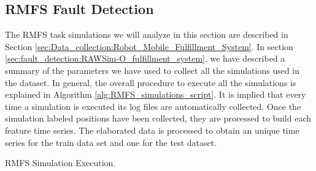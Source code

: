 \documentclass[../../Thesis.tex]{subfiles}
\begin{document}
		\subsection{RMFS Fault Detection}
			The RMFS task simulations we will analyze in this section are described in Section \ref{sec:Data_collection:Robot_Mobile_Fulfillment_System}. In section \ref{sec:fault_detection:RAWSim-O_fulfillment_system}, we have described a summary of the parameters we have used to collect all the simulations used in the dataset. In general, the overall procedure to execute all the simulations is explained in Algorithm \ref{alg:RMFS_simulations_script}. It is implied that every time a simulation is executed its log files are automatically collected. Once the simulation labeled positions have been collected, they are processed to build each feature time series. The elaborated data is processed to obtain an unique time series for the train data set and one for the test dataset. 
			\begin{algorithm}
	 		 	\caption{RMFS Simulation Execution.}
	 		 	\label{alg:RMFS_simulations_script}
			    	\begin{algorithmic}[1]
				    	\ENDFOR
			    	\ENDFOR
					    	\ENDFOR
				    	\ENDFOR
			    	\ENDFOR
					    	\ENDFOR
				    	\ENDFOR
			    	\ENDFOR
			    	\end{algorithmic}
			\end{algorithm}
\end{document}
